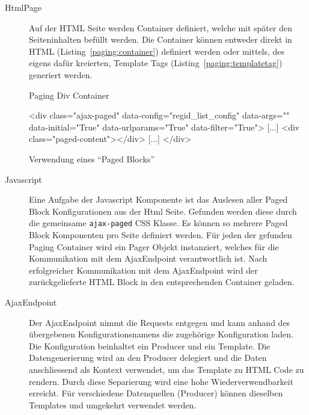 \begin{description}
\item[HtmlPage]
Auf der HTML Seite werden Container definiert, welche mit später den Seiteninhalten befüllt werden. Die Container können entweder direkt in HTML  (Listing~\ref{paging:container})
definiert werden oder mittels, des eigens dafür kreierten, Template Tags (Listing~\ref{paging:templatetag}) generiert werden.

\begin{listing}[H]
\caption{Paging Div Container}
\label{paging:container}
\begin{htmlcode}
<div class="ajax-paged"
     data-config="regid_list_config"
     data-args="{}"
     data-initial="True"
     data-urlparams="True"
     data-filter="True">
	[...]
	<div class="paged-content"></div>
	[...]
</div>
\end{htmlcode}
\end{listing}

\begin{listing}
\caption{Verwendung eines \enquote{Paged Blocks}}
\label{paging:templatetag}
\begin{pythoncode}
{%
\end{pythoncode}
\end{listing}


\item[Javascript]
Eine Aufgabe der Javascript Komponente ist das Auslesen aller Paged Block Konfigurationen aus der Html Seite. Gefunden werden diese durch die gemeinsame \texttt{ajax-paged} CSS Klasse. Es können so mehrere Paged Block Komponenten pro Seite definiert werden. Für jeden der gefunden Paging Container wird ein Pager Objekt instanziert, welches für die Kommunikation mit dem AjaxEndpoint verantwortlich ist. Nach erfolgreicher Kommunikation mit dem AjaxEndpoint wird der zurückgelieferte HTML Block in den entsprechenden Container geladen.

\item [AjaxEndpoint]
Der AjaxEndpoint nimmt die Requests entgegen und kann anhand des übergebenen Konfigurationsnamens die zugehörige Konfiguration laden.
Die Konfiguration beinhaltet ein Producer und ein Template.
Die Datengenerierung wird an den Producer delegiert und die Daten anschliessend als Kontext verwendet, um das Template zu HTML Code zu rendern.
Durch diese Separierung wird eine hohe Wiederverwendbarkeit erreicht. Für verschiedene Datenquellen (Producer) können dieselben Templates und umgekehrt verwendet werden.


\end{description}
